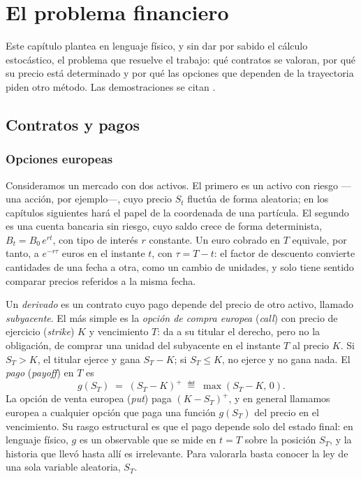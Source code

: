 \chapter{El problema financiero}\label{cap:problema_financiero}

Este capítulo plantea en lenguaje físico, y sin dar por sabido el
cálculo estocástico, el problema que resuelve el trabajo: qué contratos
se valoran, por qué su precio está determinado y por qué las opciones
que dependen de la trayectoria piden otro método. Las demostraciones se
citan \cite{tfgm, shreve, hull}.

\section{Contratos y pagos}\label{sec:contratos}

\subsection{Opciones europeas}\label{subsec:europeas}

Consideramos un mercado con dos activos. El primero es un activo con
riesgo ---una acción, por ejemplo---, cuyo precio $S_t$ fluctúa de forma
aleatoria; en los capítulos siguientes hará el papel de la coordenada
de una partícula. El segundo es una cuenta bancaria sin riesgo, cuyo
saldo crece de forma determinista, $B_t = B_0\, e^{rt}$, con tipo de
interés $r$ constante. Un euro cobrado en $T$ equivale, por tanto, a
$e^{-r\tau}$ euros en el instante $t$, con $\tau = T - t$: el factor de
descuento convierte cantidades de una fecha a otra, como un cambio de
unidades, y solo tiene sentido comparar precios referidos a la misma
fecha.

Un \emph{derivado} es un contrato cuyo pago depende del precio de otro
activo, llamado \emph{subyacente}. El más simple es la \emph{opción de
compra europea} (\emph{call}) con precio de ejercicio (\emph{strike})
$K$ y vencimiento $T$: da a su titular el derecho, pero no la
obligación, de comprar una unidad del subyacente en el instante $T$ al
precio $K$. Si $S_T > K$, el titular ejerce y gana $S_T - K$; si
$S_T \leq K$, no ejerce y no gana nada. El \emph{pago} (\emph{payoff})
en $T$ es
\begin{equation}\label{eq:pago_call}
  g(S_T) \;=\; (S_T - K)^+ \;\eqdef\; \max(S_T - K,\, 0).
\end{equation}
La opción de venta europea (\emph{put}) paga $(K - S_T)^+$, y en general
llamamos europea a cualquier opción que paga una función $g(S_T)$ del
precio en el vencimiento. Su rasgo estructural es que el pago depende
solo del estado final: en lenguaje físico, $g$ es un observable que se
mide en $t = T$ sobre la posición $S_T$, y la historia que llevó hasta
allí es irrelevante. Para valorarla basta conocer la ley de una sola
variable aleatoria, $S_T$.

